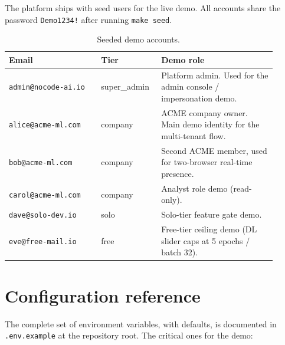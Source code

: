 \documentclass[12pt, a4paper, oneside]{report}
\begin{document}
The platform ships with seed users for the live demo. All accounts
share the password \texttt{Demo1234!} after running \texttt{make seed}.

\begin{table}[H]
\centering
\caption{Seeded demo accounts.}
\label{tab:demo_accounts}
\begin{tabular}{|p{0.32\linewidth}|p{0.18\linewidth}|L{0.40\linewidth}|}
\hline
\textbf{Email} & \textbf{Tier} & \textbf{Demo role} \\ \hline
\texttt{admin@nocode-ai.io} & super\_admin & Platform admin. Used for the admin console / impersonation demo. \\ \hline
\texttt{alice@acme-ml.com} & company & ACME company owner. Main demo identity for the multi-tenant flow. \\ \hline
\texttt{bob@acme-ml.com} & company & Second ACME member, used for two-browser real-time presence. \\ \hline
\texttt{carol@acme-ml.com} & company & Analyst role demo (read-only). \\ \hline
\texttt{dave@solo-dev.io} & solo & Solo-tier feature gate demo. \\ \hline
\texttt{eve@free-mail.io} & free & Free-tier ceiling demo (DL slider caps at 5 epochs / batch 32). \\ \hline
\end{tabular}
\end{table}

\chapter{Configuration reference}
\label{annex:config}

The complete set of environment variables, with defaults, is
documented in \texttt{.env.example} at the repository root. The
critical ones for the demo:
\end{document}

